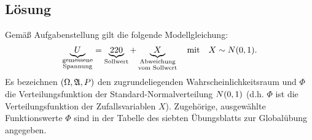 \documentclass{exercise}
\begin{document}
    \subsection*{Lösung}
    Gemäß Aufgabenstellung gilt die folgende Modellgleichung:
    \begin{equation}\label{eq:1}
        \underbrace{U}_{\substack{\text{gemessene}\\\text{Spannung}}} = \underbrace{220}_{\text{Sollwert}} + \underbrace{X}_{\substack{\text{Abweichung}\\\text{vom Sollwert}}} \quad \text{mit} \quad X \sim N\parentheses*{0, 1}.
    \end{equation}
    Es bezeichnen \(\parentheses*{\Omega, \mathfrak{A}, P}\) den zugrundeliegenden Wahrscheinlichkeitsraum und \(\Phi\) die Verteilungsfunktion der Standard-Normalverteilung \(N\parentheses*{0, 1}\) (d.h. \(\Phi\) ist die Verteilungsfunktion der Zufallsvariablen \(X\)).
    Zugehörige, ausgewählte Funktionswerte \(\Phi\) sind in der Tabelle des siebten Übungsblatts zur Globalübung angegeben.
\end{document}
